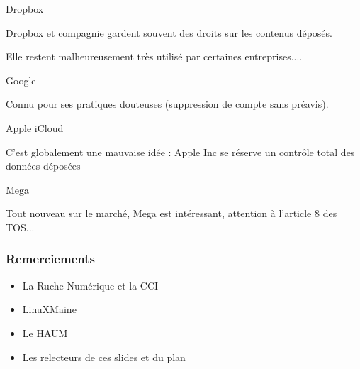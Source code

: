 \documentclass{beamer}
\begin{document}
\begin{frame}

    \begin{block}{Dropbox}

        Dropbox et compagnie gardent souvent des droits sur les contenus déposés.

        Elle restent malheureusement très utilisé par certaines entreprises....

    \end{block}

    \pause{}

    \begin{block}{Google}

        Connu pour ses pratiques douteuses (suppression de compte sans préavis).

    \end{block}

\end{frame}
\begin{frame}

    \begin{block}{Apple iCloud}

        C'est globalement une mauvaise idée : Apple Inc se réserve un contrôle total des données déposées

    \end{block}

    \pause{}

    \begin{block}{Mega}

        Tout nouveau sur le marché, Mega est intéressant, attention à l'article 8 des TOS...

    \end{block}
\end{frame}

\begin{frame}
    
    \frametitle{Remerciements}

    \begin{itemize}
        \item La Ruche Numérique et la CCI
        \item LinuXMaine
        \item Le HAUM
        \item Les relecteurs de ces slides et du plan
    \end{itemize}

    \pause{}


\end{frame}
\end{document}
